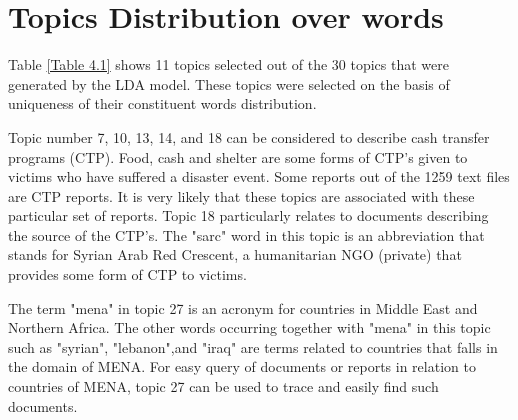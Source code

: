 \section{Topics Distribution over words}
\begin{flushleft}
Table \eqref{Table 4.1} shows 11 topics selected out of the 30 topics that were generated by the  LDA model. These topics were selected on the basis of  uniqueness of their constituent words distribution.
\end{flushleft}

\begin{flushleft}
Topic number 7, 10, 13, 14, and 18 can be considered to describe cash transfer programs (CTP). Food, cash and shelter are some forms of CTP's given to victims who have suffered  a disaster event. Some  reports out of the 1259 text files are CTP reports. It is very likely that these topics are associated with these particular set of reports. Topic 18 particularly relates to documents describing the source of the CTP's. The "sarc" word in this topic is an abbreviation that stands for Syrian Arab Red Crescent, a humanitarian NGO (private) that provides some form of  CTP to victims.
\end{flushleft}

\begin{flushleft}
The term "mena" in topic 27 is an acronym for countries in Middle East and Northern Africa. The other words occurring together with "mena" in this topic such as "syrian", "lebanon",and "iraq" are terms related to countries that falls in the domain of MENA. For easy query of documents or reports in relation to countries of MENA, topic 27 can be used to trace and easily find such documents.
\end{flushleft}

